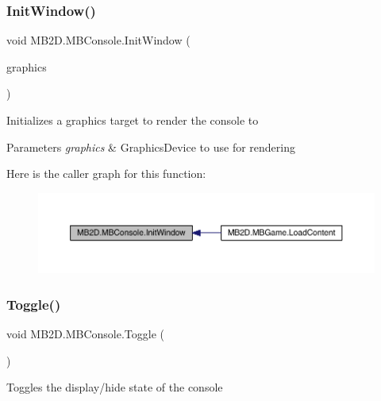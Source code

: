 \subsubsection{\texorpdfstring{Init\+Window()}{InitWindow()}}
{\footnotesize\ttfamily void M\+B2\+D.\+M\+B\+Console.\+Init\+Window (\begin{DoxyParamCaption}\item[{Graphics\+Device}]{graphics }\end{DoxyParamCaption})\hspace{0.3cm}{\ttfamily [inline]}}



Initializes a graphics target to render the console to 


\begin{DoxyParams}{Parameters}
{\em graphics} & Graphics\+Device to use for rendering\\
\hline
\end{DoxyParams}
Here is the caller graph for this function\+:
\nopagebreak
\begin{figure}[H]
\begin{center}
\leavevmode
\includegraphics[width=350pt]{class_m_b2_d_1_1_m_b_console_a745ef1f55523b29b83d4d94c1fe5400b_icgraph}
\end{center}
\end{figure}
\hypertarget{class_m_b2_d_1_1_m_b_console_aab4c284a98afb148e35cf28e6d8ba0fc}{}\label{class_m_b2_d_1_1_m_b_console_aab4c284a98afb148e35cf28e6d8ba0fc} 
\subsubsection{\texorpdfstring{Toggle()}{Toggle()}}
{\footnotesize\ttfamily void M\+B2\+D.\+M\+B\+Console.\+Toggle (\begin{DoxyParamCaption}{ }\end{DoxyParamCaption})\hspace{0.3cm}{\ttfamily [inline]}}



Toggles the display/hide state of the console 

